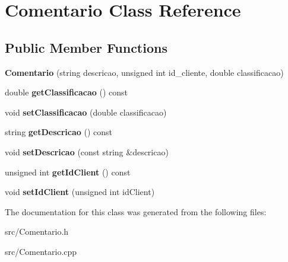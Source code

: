 \hypertarget{class_comentario}{\section{Comentario Class Reference}
\label{class_comentario}
}
\subsection*{Public Member Functions}
\begin{DoxyCompactItemize}
\item 
\hypertarget{class_comentario_a86098067f03cec1a3b0f11e1890b48d1}{{\bfseries Comentario} (string descricao, unsigned int id\+\_\+cliente, double classificacao)}\label{class_comentario_a86098067f03cec1a3b0f11e1890b48d1}

\item 
\hypertarget{class_comentario_a72b3f558e4efa7aa193a4a8dcf584342}{double {\bfseries get\+Classificacao} () const }\label{class_comentario_a72b3f558e4efa7aa193a4a8dcf584342}

\item 
\hypertarget{class_comentario_af9f6f741bc2b95e4b9457eae446e8f39}{void {\bfseries set\+Classificacao} (double classificacao)}\label{class_comentario_af9f6f741bc2b95e4b9457eae446e8f39}

\item 
\hypertarget{class_comentario_a1b9f374ef488c1fb1332081e767e14e8}{string {\bfseries get\+Descricao} () const }\label{class_comentario_a1b9f374ef488c1fb1332081e767e14e8}

\item 
\hypertarget{class_comentario_a40aefe877479a08900a1e25803fa8616}{void {\bfseries set\+Descricao} (const string \&descricao)}\label{class_comentario_a40aefe877479a08900a1e25803fa8616}

\item 
\hypertarget{class_comentario_ab3f00d37b18638e59b7e8e5a8f15c8d5}{unsigned int {\bfseries get\+Id\+Client} () const }\label{class_comentario_ab3f00d37b18638e59b7e8e5a8f15c8d5}

\item 
\hypertarget{class_comentario_ab74417e4b1ab747486355e425e1e515a}{void {\bfseries set\+Id\+Client} (unsigned int id\+Client)}\label{class_comentario_ab74417e4b1ab747486355e425e1e515a}

\end{DoxyCompactItemize}


The documentation for this class was generated from the following files\+:\begin{DoxyCompactItemize}
\item 
src/Comentario.\+h\item 
src/Comentario.\+cpp\end{DoxyCompactItemize}
